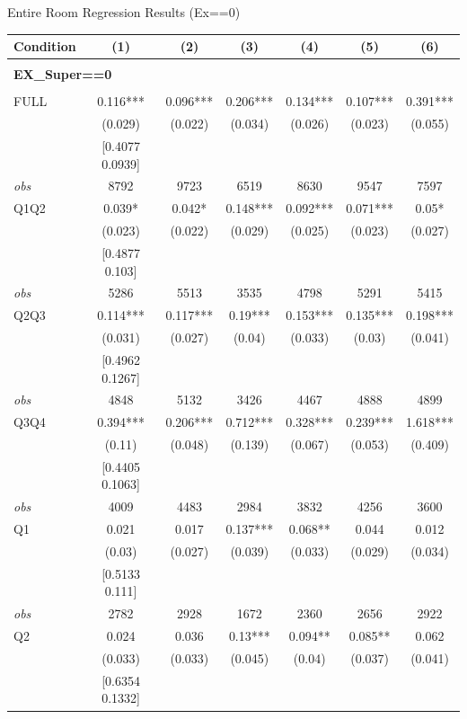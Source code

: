 \begin{table}[]
\TABLE
{Entire Room Regression Results (Ex==0) \label{result_detail2}}{\begin{tabular}{lcccccc}
\hline
Condition & (1) & (2) & (3) & (4) & (5) & (6) \\ \hline
\\ 
\multicolumn{5}{l}{\textbf{EX\_Super==0}} \\ 
\\ 
FULL & 0.116*** & 0.096*** & 0.206*** & 0.134*** & 0.107*** & 0.391*** \\ 
&(0.029)&(0.022) & (0.034)&(0.026)&(0.023)&(0.055)\\ 
& [0.4077 0.0939] & & & & & \\ 
\textit{obs} & 8792 & 9723 & 6519 & 8630 & 9547 & 7597 \\ 
Q1Q2 & 0.039* & 0.042* & 0.148*** & 0.092*** & 0.071*** & 0.05* \\ 
&(0.023)&(0.022) & (0.029)&(0.025)&(0.023)&(0.027)\\ 
& [0.4877 0.103] & & & & & \\ 
\textit{obs} & 5286 & 5513 & 3535 & 4798 & 5291 & 5415 \\ 
Q2Q3 & 0.114*** & 0.117*** & 0.19*** & 0.153*** & 0.135*** & 0.198*** \\ 
&(0.031)&(0.027) & (0.04)&(0.033)&(0.03)&(0.041)\\ 
& [0.4962 0.1267] & & & & & \\ 
\textit{obs} & 4848 & 5132 & 3426 & 4467 & 4888 & 4899 \\ 
Q3Q4 & 0.394*** & 0.206*** & 0.712*** & 0.328*** & 0.239*** & 1.618*** \\ 
&(0.11)&(0.048) & (0.139)&(0.067)&(0.053)&(0.409)\\ 
& [0.4405 0.1063] & & & & & \\ 
\textit{obs} & 4009 & 4483 & 2984 & 3832 & 4256 & 3600 \\ 
Q1 & 0.021 & 0.017 & 0.137*** & 0.068** & 0.044 & 0.012 \\ 
&(0.03)&(0.027) & (0.039)&(0.033)&(0.029)&(0.034)\\ 
& [0.5133 0.111] & & & & & \\ 
\textit{obs} & 2782 & 2928 & 1672 & 2360 & 2656 & 2922 \\ 
Q2 & 0.024 & 0.036 & 0.13*** & 0.094** & 0.085** & 0.062 \\ 
&(0.033)&(0.033) & (0.045)&(0.04)&(0.037)&(0.041)\\ 
& [0.6354 0.1332] & & & & & \\ 

\end{tabular}}
\end{table}

